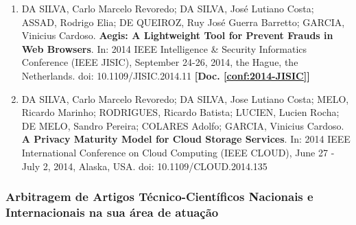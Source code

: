 \documentclass[a4paper,oneside,10pt]{article}
\begin{document}
\begin{enumerate}
\item DA SILVA, Carlo Marcelo Revoredo; DA SILVA, José Lutiano Costa; ASSAD, Rodrigo Elia; DE QUEIROZ, Ruy José Guerra Barretto; GARCIA, Vinicius Cardoso. \textbf{Aegis: A Lightweight Tool for Prevent Frauds in Web Browsers}. In: 2014 IEEE Intelligence \& Security Informatics Conference (IEEE JISIC), September 24-26, 2014, the Hague, the Netherlands. doi: 10.1109/JISIC.2014.11 \textbf{[Doc. \ref{conf:2014-JISIC}]}%

\item DA SILVA, Carlo Marcelo Revoredo; DA SILVA, Jose Lutiano Costa; MELO, Ricardo Marinho; RODRIGUES, Ricardo Batista; LUCIEN, Lucien Rocha; DE MELO, Sandro Pereira; COLARES Adolfo; GARCIA, Vinicius Cardoso. \textbf{A Privacy Maturity Model for Cloud Storage Services}. In: 2014 IEEE International Conference on Cloud Computing (IEEE CLOUD), June 27 - July 2, 2014, Alaska, USA. doi: 10.1109/CLOUD.2014.135 \mbox{}

\end{enumerate}






\subsubsection{Arbitragem de Artigos Técnico-Científicos Nacionais e Internacionais na sua área de atuação}
\vspace{0.3cm}
\end{document}
